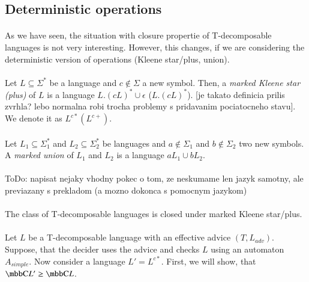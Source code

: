 \subsection{Deterministic operations}
\paragraph{}
As we have seen, the situation with closure propertie of T-decomposable languages is not very interesting. However, this changes, if we are considering the deterministic version of operations (Kleene star/plus, union).

\paragraph{}
 Let $L \subseteq \Sigma^*$ be a language and $c \notin \Sigma$ a new symbol. Then, a \emph{marked Kleene star (plus)} of $L$ is a language $L.(cL)^* \cup \epsilon$ ($L.(cL)^*$). \color{red}[je takato definicia prilis zvrhla? lebo normalna robi trocha problemy s pridavanim pociatocneho stavu]\color{black}. We denote it as $L^{c*} (L^{c+})$.

\paragraph{}
 Let $L_1 \subseteq \Sigma_1^*$ and $L_2 \subseteq \Sigma_2^*$ be languages and $a \notin \Sigma_1$ and $b \notin \Sigma_2$ two new symbols. A \emph{marked union} of $L_1$ and $L_2$ is a language $aL_1 \cup bL_2$.

\paragraph{}
\color{red}ToDo: napisat nejaky vhodny pokec o tom, ze neskumame len jazyk samotny, ale previazany s prekladom (a mozno dokonca s pomocnym jazykom)\color{black}

\paragraph{}
\cveta The class of T-decomposable languages is closed under marked Kleene star/plus.

\paragraph{}
\dokaz Let $L$ be a T-decomposable language with an effective advice $(T, L_{adv})$. Suppose, that the decider uses the advice and checks $L$ using an automaton $A_{simple}$. Now consider a language $L' = L^{c*}$. First, we will show, that $\C{L'} \geq \C{L}$.

